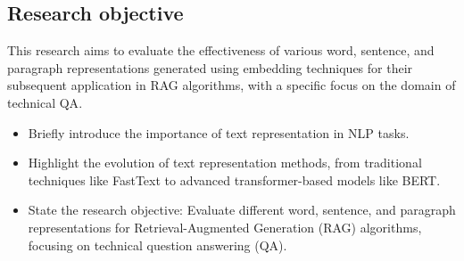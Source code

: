 \subsection{Research objective}

This research aims to evaluate the effectiveness of various word, sentence, and paragraph representations generated using embedding techniques for their subsequent application in \ac{RAG} algorithms, with a specific focus on the domain of technical \ac{QA}.

\begin{itemize}
  \item Briefly introduce the importance of text representation in \ac{NLP} tasks.
  \item Highlight the evolution of text representation methods, from traditional techniques like FastText to advanced transformer-based models like BERT.
  \item State the research objective: Evaluate different word, sentence, and paragraph representations for Retrieval-Augmented Generation (RAG) algorithms, focusing on technical question answering (QA).
\end{itemize}

